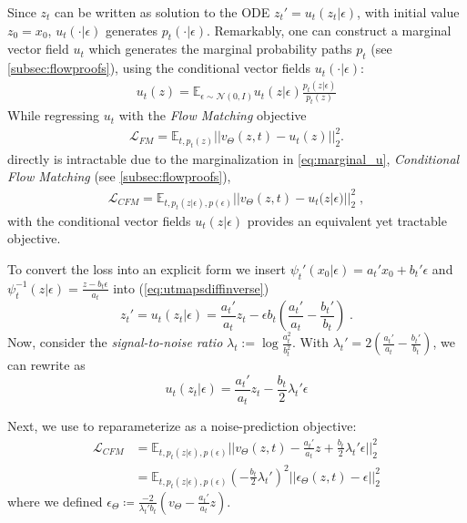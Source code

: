 %
%
%
%
%
%
%
%
%
%
Since $z_t$ can be written as solution to the ODE  $z_t' = u_t(z_t |\epsilon)$, with initial value $z_0=x_0$, $u_t(\cdot | \epsilon)$ generates $p_t(\cdot | \epsilon)$.
Remarkably, one can construct a marginal vector field $u_t$ which generates the marginal probability paths $p_t$  \cite{lipman2023flow} (see \ref{subsec:flowproofs}), using the conditional vector fields $u_t(\cdot | \epsilon)$:
\begin{align}
    u_t(z) = \mathbb{E}_{\epsilon \sim
  \mathcal{N}(0,I)} u_t(z \vert \epsilon) \frac{p_t(z \vert
  \epsilon)}{p_t(z)}
  \label{eq:marginal_u}
\end{align}
While regressing $u_t$ with the \emph{Flow Matching} objective 
\begin{align}
   \mathcal{L}_{FM} =  \mathbb{E}_{t, p_t(z)} || v_{\Theta}(z, t) - u_t(z) ||_2^2.
\end{align}
directly is intractable due to the marginalization in \eqref{eq:marginal_u}, 
\emph{Conditional Flow Matching} (see \ref{subsec:flowproofs}),
\begin{align}
   \mathcal{L}_{CFM} =  \mathbb{E}_{t, p_t(z | \epsilon), p(\epsilon) }|| v_{\Theta}(z, t) - u_t(z | \epsilon)  ||_2^2\;, \label{eq:condflowmatch}
\end{align}
with the conditional vector fields $u_t(z \vert \epsilon)$ provides an equivalent yet tractable objective.

%
%
%

To convert the loss into an explicit form we insert
 $\psi_t'(x_0 \vert \epsilon) = a_t'x_0 + b_t' \epsilon$ and $\psi_t^{-1}(z\vert \epsilon) = \frac{z -b_t \epsilon}{a_t}$ into (\ref{eq:utmapsdiffinverse})
\begin{equation}
  z_t' = u_t(z_t \vert \epsilon) = \frac{a_t'}{a_t} z_t - \epsilon b_t (\frac{a_t'}{a_t} - \frac{b_t'}{b_t})\;.
  \label{eq:zode}
\end{equation}
%
%
%
%
%
%
%
Now, consider the \emph{signal-to-noise ratio} $\lambda_t := \log \frac{a_t^2}{b_t^2}$. 
With $\lambda_t' = 2 (\frac{a_t'}{a_t} - \frac{b_t'}{b_t})$, we can rewrite  as 
\begin{equation}
  u_t(z_t \vert \epsilon) = \frac{a_t'}{a_t} z_t - \frac{b_t}{2} \lambda_t' \epsilon 
  \label{eq:zodewithlambda}
\end{equation}

Next, we use  to reparameterize  as a noise-prediction objective:
\begin{align}
    \mathcal{L}_{CFM} &= \mathbb{E}_{t, p_t(z | \epsilon), p(\epsilon) } || v_{\Theta}(z, t) - \frac{a_t'}{a_t} z  + \frac{b_t}{2} \lambda_t' \epsilon ||_2^2 \\
    &= \mathbb{E}_{t, p_t(z | \epsilon), p(\epsilon) } \left(-\frac{b_t}{2}\lambda_t' \right)^2  || \epsilon_\Theta(z, t) - \epsilon ||_2^2
\end{align}
%
where we defined $\epsilon_\Theta \coloneqq \frac{-2}{\lambda_t' b_t} (v_\Theta - \frac{a_t'}{a_t} z)$. 


